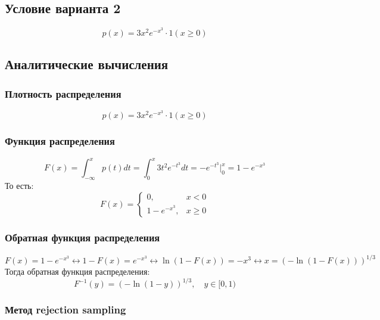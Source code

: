 \documentclass[a4paper,14pt]{extarticle}
\begin{document}
        \subsection*{Условие варианта 2}
            
            \[
                p(x) = 3x^2 e^{-x^3} \cdot 1(x \geq 0)
            \]
        
        \subsection*{Аналитические вычисления}
            
            \subsubsection*{Плотность распределения}
                \[
                    p(x) = 3x^2 e^{-x^3} \cdot 1(x \geq 0)
                \]
            
            \subsubsection*{Функция распределения}
                \[
                    F(x) =
                    \int_{-\infty}^{x} p(t) dt =
                    \int_{0}^{x} 3t^2 e^{-t^3} dt =
                    -e^{-t^3} \Big|_{0}^{x} =
                    1 - e^{-x^3}
                \]
                То есть:
                \[
                    F(x) = \begin{cases}
                               0, & x < 0 \\
                               1 - e^{-x^3}, & x \geq 0
                    \end{cases}
                \]
            
            \subsubsection*{Обратная функция распределения}
                \[
                    F(x) = 1 - e^{-x^3} \leftrightarrow
                    1 - F(x) = e^{-x^3} \leftrightarrow
                    \ln(1 - F(x)) = -x^3 \leftrightarrow
                    x = (-\ln(1 - F(x)))^{1/3}
                \]
                Тогда обратная функция распределения:
                \[
                    F^{-1}(y) = (-\ln(1 - y))^{1/3}, \quad y \in [0, 1)
                \]
            
            \subsubsection*{Метод rejection sampling}
                
\end{document}
